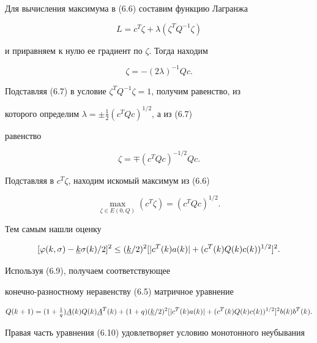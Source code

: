 Для вычисления максимума в (6.6) составим функцию Лагранжа


$$


L=c^T\zeta+\lambda(\zeta^T Q^{-1}\zeta)


$$


и приравняем к нулю ее градиент по $\zeta$. Тогда находим


\begin{equation}


\zeta=-(2\lambda)^{-1}Q c.


\end{equation}


Подставляя (6.7) в условие $\zeta^T Q^{-1}\zeta=1$, получим равенство, из


которого определим $\lambda=\pm\frac{1}{2}(c^T Q c)^{1/2}$, а из (6.7)


равенство


$$


\zeta=\mp(c^T Q c)^{-1/2}Q c.


$$


Подставляя в $c^T\zeta$, находим искомый максимум из (6.6)


\begin{equation}


\max_{\zeta\in E(0,Q)}(c^T\zeta)=(c^T Q c)^{1/2}.


\end{equation}





Тем самым нашли оценку


\begin{equation}


[\varphi(k,\sigma)-\uk\sigma(k)/2]^2\le(\uk/2)^2


[|c^T(k)a(k)|+(c^T(k)Q(k)c(k))^{1/2}]^2.


\end{equation}


Используя (6.9), получаем соответствующее


конечно-разностному неравенству (6.5) матричное уравнение


\begin{equation}


Q(k+1)=(1+\tfrac{1}{q})\uA(k)Q(k)\uA^T(k)+(1+q)(\uk/2)^2


[|c^T(k)a(k)|+(c^T(k)Q(k)c(k))^{1/2}]^2b(k)b^T(k).


\end{equation}


Правая часть уравнения (6.10) удовлетворяет условию монотонного неубывания


